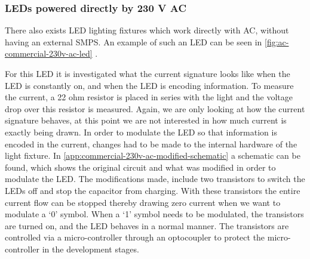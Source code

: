 
\subsubsection{LEDs powered directly by 230 V AC}


There also exists LED lighting fixtures which work directly with AC, without having an external SMPS.
An example of such an LED can be seen in \autoref{fig:ac-commercial-230v-ac-led} \cite{commercial-230v-ac-led-aliexpress}.



For this LED it is investigated what the current signature looks like when the LED is constantly on, and when the LED is encoding information.
To measure the current, a 22 ohm resistor is placed in series with the light and the voltage drop over this resistor is measured.
Again, we are only looking at how the current signature behaves, at this point we are not interested in how much current is exactly being drawn.
In order to modulate the LED so that information is encoded in the current, changes had to be made to the internal hardware of the light fixture.
In \autoref{app:commercial-230v-ac-modified-schematic} a schematic can be found, which shows the original circuit and what was modified in order to modulate the LED.
The modifications made, include two transistors to switch the LEDs off and stop the capacitor from charging. 
With these transistors the entire current flow can be stopped thereby drawing zero current when we want to modulate a `0' symbol.
When a `1' symbol needs to be modulated, the transistors are turned on, and the LED behaves in a normal manner.
The transistors are controlled via a micro-controller through an optocoupler to protect the micro-controller in the development stages.




